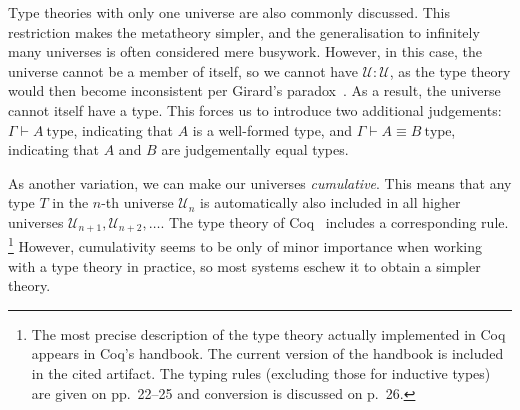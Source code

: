 \documentclass{scrartcl}
\theoremstyle{definition}
\newcommand{\type}{\mathrm{type}}
\newcommand{\Univ}{\mathcal{U}}
\begin{document}
Type theories with only one universe are also commonly discussed.
This restriction makes the metatheory simpler, and the generalisation to infinitely many universes is often considered mere busywork.
However, in this case, the universe cannot be a member of itself, so we cannot have $\Univ : \Univ$, as the type theory would then become inconsistent per Girard's paradox~\cite{girard:thesis,DBLP:conf/tlca/Hurkens95}.
As a result, the universe cannot itself have a type.
This forces us to introduce two additional judgements: $Γ ⊢ A~\type$, indicating that $A$ is a well-formed type, and $Γ ⊢ A ≡ B~\type$, indicating that $A$ and $B$ are judgementally equal types.

As another variation, we can make our universes \emph{cumulative}.
This means that any type $T$ in the $n$-th universe $\Univ_{n}$ is automatically also included in all higher universes $\Univ_{n+1}, \Univ_{n+2}, \dots$.
The type theory of Coq~\cite{coq} includes a corresponding rule.%
\footnote{The most precise description of the type theory actually implemented in Coq appears in Coq's handbook.
  The current version of the handbook is included in the cited artifact.
  The typing rules (excluding those for inductive types) are given on pp.\ 22--25 and conversion is discussed on p.\ 26.}
However, cumulativity seems to be only of minor importance when working with a type theory in practice, so most systems eschew it to obtain a simpler theory.


\end{document}
